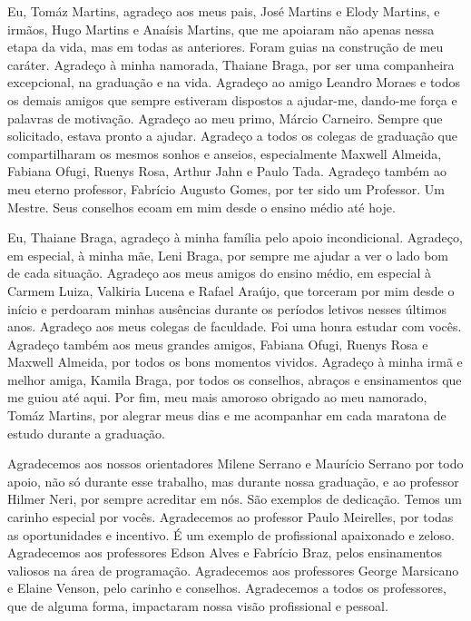 \begin{agradecimentos}
Eu, Tomáz Martins, agradeço aos meus pais, José Martins e Elody Martins, e irmãos, Hugo Martins e Anaísis Martins, que me apoiaram não apenas nessa etapa da vida, mas em todas as anteriores. Foram guias na construção de meu caráter. Agradeço à minha namorada, Thaiane Braga, por ser uma companheira excepcional, na graduação e na vida. Agradeço ao amigo Leandro Moraes e todos os demais amigos que sempre estiveram dispostos a ajudar-me, dando-me força e palavras de motivação. Agradeço ao meu primo, Márcio Carneiro. Sempre que solicitado, estava pronto a ajudar. Agradeço a todos os colegas de graduação que compartilharam os mesmos sonhos e anseios, especialmente Maxwell Almeida, Fabiana Ofugi, Ruenys Rosa, Arthur Jahn e Paulo Tada. Agradeço também ao meu eterno professor, Fabrício Augusto Gomes, por ter sido um Professor. Um Mestre. Seus conselhos ecoam em mim desde o ensino médio até hoje.

Eu, Thaiane Braga, agradeço à minha família pelo apoio incondicional. Agradeço, em especial, à minha mãe, Leni Braga, por sempre me ajudar a ver o lado bom de cada situação. Agradeço aos meus amigos do ensino médio, em especial à Carmem Luiza, Valkiria Lucena e Rafael Araújo, que torceram por mim desde o início e perdoaram minhas ausências durante os períodos letivos nesses últimos anos. Agradeço aos meus colegas de faculdade. Foi uma honra estudar com vocês. Agradeço também aos meus grandes amigos, Fabiana Ofugi, Ruenys Rosa e Maxwell Almeida, por todos os bons momentos vividos.  Agradeço à minha irmã e melhor amiga, Kamila Braga, por todos os conselhos, abraços e ensinamentos que me guiou até aqui. Por fim, meu mais amoroso obrigado ao meu namorado, Tomáz Martins, por alegrar meus dias e me acompanhar em cada maratona de estudo durante a graduação.

Agradecemos aos nossos orientadores Milene Serrano e Maurício Serrano por todo apoio, não só durante esse trabalho, mas durante nossa graduação, e ao professor Hilmer Neri, por sempre acreditar em nós. São exemplos de dedicação. Temos um carinho especial por vocês. Agradecemos ao professor Paulo Meirelles, por todas as oportunidades e incentivo. É um exemplo de profissional apaixonado e zeloso. Agradecemos aos professores Edson Alves e Fabrício Braz, pelos ensinamentos valiosos na área de programação. Agradecemos aos professores George Marsicano e Elaine Venson, pelo carinho e conselhos. Agradecemos a todos os professores, que de alguma forma, impactaram nossa visão profissional e pessoal. 
\end{agradecimentos}
